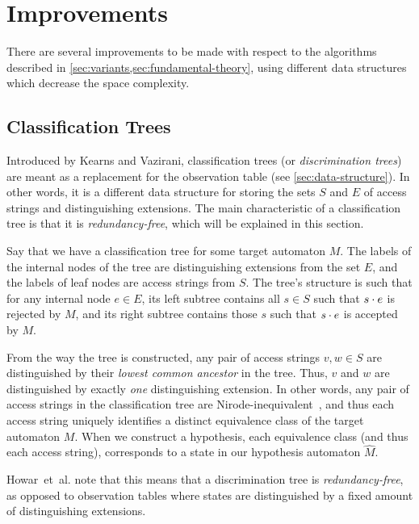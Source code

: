 \documentclass[multi,crop=false,class=article]{standalone}
\begin{document}
\section{Improvements}
\label{sec:improvements}
There are several improvements to be made with respect to the algorithms
described in \cref{sec:variants,sec:fundamental-theory}, using different data
structures which decrease the space complexity.

\subsection{Classification Trees}
\label{sec:classification-trees}
Introduced by Kearns and Vazirani\cite{Kearns94}, classification trees (or
\textit{discrimination trees}) are meant as a replacement for the observation
table (see \cref{sec:data-structure}). In other words, it is a different data
structure for storing the sets $S$ and $E$ of access strings and distinguishing
extensions. The main characteristic of a classification tree is that it is
\textit{redundancy-free}, which will be explained in this section.

Say that we have a classification tree for some target automaton $M$. The labels
of the internal nodes of the tree are distinguishing extensions from the set
$E$, and the labels of leaf nodes are access strings from $S$. The tree's
structure is such that for any internal node $e \in E$, its left subtree
contains all $s \in S$ such that $s \cdot e$ is rejected by $M$, and its right
subtree contains those $s$ such that $s \cdot e$ is accepted by $M$.

From the way the tree is constructed, any pair of access strings $v,w \in S$ are
distinguished by their \textit{lowest common ancestor} in the tree. Thus, $v$
and $w$ are distinguished by exactly \textit{one} distinguishing extension. In
other words, any pair of access strings in the classification tree are
Nirode-inequivalent~, and thus each access
string uniquely identifies a distinct equivalence class of the target automaton
$M$. When we construct a hypothesis, each equivalence class (and thus each
access string), corresponds to a state in our hypothesis automaton $\hat M$.

Howar~et~al. note that this means that a discrimination tree is
\textit{redundancy-free}, as opposed to observation tables where states are
distinguished by a fixed amount of distinguishing extensions\cite{Howar14}.
\end{document}
